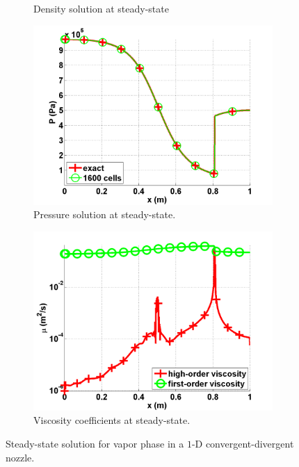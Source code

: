 \documentclass[preprint,10pt]{elsarticle}
\begin{document}
\begin{figure}[H]
\begin{subfigure}[b]{0.495\textwidth}
                \caption{Density solution at steady-state}
                \label{fig:1d_nozzle_vap_density}
        \end{subfigure}
        \begin{subfigure}[b]{0.495\textwidth}
                \centering
                \includegraphics[width=\textwidth]{vapor_pressure_numerical_and_exact_1600.png}
                \caption{Pressure solution at steady-state.}
                \label{fig:1d_nozzle_vap_press}
        \end{subfigure}
        \begin{subfigure}[b]{0.495\textwidth}
                \centering
                \includegraphics[width=\textwidth]{vapor_viscosity_numerical1600.png}
                \caption{Viscosity coefficients at steady-state.}
                \label{fig:1d_nozzle_vap_visc}
        \end{subfigure}
        \caption{Steady-state solution for vapor phase in a $1$-D convergent-divergent nozzle.}\label{fig:1d_vap_nozzle}
\end{figure}
\end{document}
